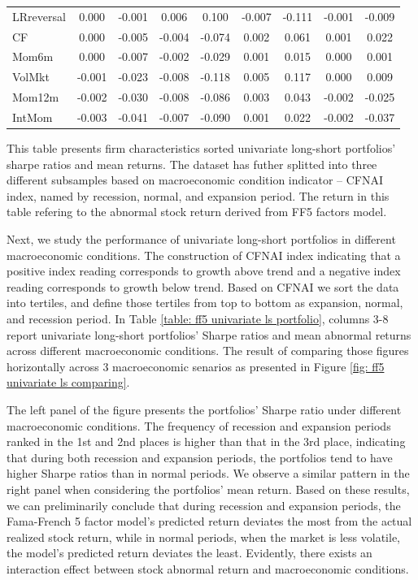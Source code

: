 \begin{table}[H]
\begin{tabular}{lcc|cc|cc|cc}
      LRreversal & 0.000 & -0.001 & 0.006 & 0.100 & -0.007 & -0.111 & -0.001 & -0.009 \\ 
      CF & 0.000 & -0.005 & -0.004 & -0.074 & 0.002 & 0.061 & 0.001 & 0.022 \\ 
      Mom6m & 0.000 & -0.007 & -0.002 & -0.029 & 0.001 & 0.015 & 0.000 & 0.001 \\ 
      VolMkt & -0.001 & -0.023 & -0.008 & -0.118 & 0.005 & 0.117 & 0.000 & 0.009 \\ 
      Mom12m & -0.002 & -0.030 & -0.008 & -0.086 & 0.003 & 0.043 & -0.002 & -0.025 \\ 
      IntMom & -0.003 & -0.041 & -0.007 & -0.090 & 0.001 & 0.022 & -0.002 & -0.037 \\ \hline
  \end{tabular}
  \begin{tablenotes}
    \footnotesize
    \item This table presents firm characteristics sorted univariate long-short portfolios' sharpe ratios and mean returns. The dataset has futher splitted into three different subsamples based on macroeconomic condition indicator -- CFNAI index, named by recession, normal, and expansion period. The return in this table refering to the abnormal stock return derived from FF5 factors model.
  \end{tablenotes}
\end{table}

Next, we study the performance of univariate long-short portfolios in different macroeconomic conditions. The construction of CFNAI index indicating that a positive index reading corresponds to growth above trend and a negative index reading corresponds to growth below trend. Based on CFNAI we sort the data into tertiles, and define those tertiles from top to bottom as expansion, normal, and recession period. In Table \ref{table: ff5 univariate ls portfolio}, columns 3-8 report univariate long-short portfolios' Sharpe ratios and mean abnormal returns across different macroeconomic conditions. The result of comparing those figures horizontally across 3 macroeconomic senarios as presented in Figure \ref{fig: ff5 univariate ls comparing}. 

The left panel of the figure presents the portfolios' Sharpe ratio under different macroeconomic conditions. The frequency of recession and expansion periods ranked in the 1st and 2nd places is higher than that in the 3rd place, indicating that during both recession and expansion periods, the portfolios tend to have higher Sharpe ratios than in normal periods. We observe a similar pattern in the right panel when considering the portfolios' mean return. Based on these results, we can preliminarily conclude that during recession and expansion periods, the Fama-French 5 factor model's predicted return deviates the most from the actual realized stock return, while in normal periods, when the market is less volatile, the model's predicted return deviates the least. Evidently, there exists an interaction effect between stock abnormal return and macroeconomic conditions.

